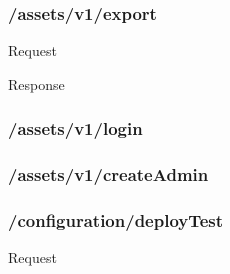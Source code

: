 \hypertarget{assetsv1export}{%
\subsubsection{/assets/v1/export}\label{assetsv1export}}

Request

\begin{Shaded}
\begin{Highlighting}[]
\FunctionTok{\{}
     \FunctionTok{:} 
\FunctionTok{\}}
\end{Highlighting}
\end{Shaded}

Response

\begin{Shaded}
\begin{Highlighting}[]
\FunctionTok{\{}
    \FunctionTok{:} \FunctionTok{,}
    \FunctionTok{:} \FunctionTok{,}
    \FunctionTok{:} 
\FunctionTok{\}}
\end{Highlighting}
\end{Shaded}

\hypertarget{assetsv1login}{%
\subsubsection{/assets/v1/login}\label{assetsv1login}}

\hypertarget{assetsv1createadmin}{%
\subsubsection{/assets/v1/createAdmin}\label{assetsv1createadmin}}

\hypertarget{configurationdeploytest}{%
\subsubsection{/configuration/deployTest}\label{configurationdeploytest}}

Request

\begin{Shaded}
\begin{Highlighting}[]
\FunctionTok{\{}
    \FunctionTok{:} \FunctionTok{,}
     \FunctionTok{:} 
\FunctionTok{\}}
\end{Highlighting}
\end{Shaded}

